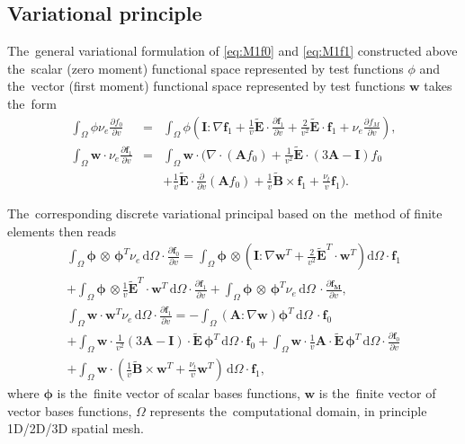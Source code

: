 \documentclass[preprint,12pt]{elsarticle}
\newcommand{\pdv}[2]{\frac{\partial{#1}}{\partial{#2}}}
\newcommand{\vect}[1]{\boldsymbol{#1}}
\newcommand{\matr}[1]{\mathbf{#1}}
\newcommand{\dI}{\text{d}}
\newcommand{\nue}{\nu_{e}}
\newcommand{\nutot}{\nu_{t}}
\newcommand{\vmag}{v}
\newcommand{\B}{\vect{B}}
\newcommand{\tE}{\vect{\tilde{E}}}
\newcommand{\tB}{\vect{\tilde{B}}}
\newcommand{\fM}{f_M}
\newcommand{\fzero}{f_0}
\newcommand{\vfzero}{\vect{f}_0}
\newcommand{\fone}{\vect{f}_1}
\newcommand{\MI}{\matr{I}}
\newcommand{\MA}{\matr{A}}
\newcommand{\intO}{\int_{\Omega}}
\newcounter{bla}
\begin{document}
\subsection{Variational principle}
The~general variational formulation of \eqref{eq:M1f0} and \eqref{eq:M1f1} 
constructed above the~scalar (zero moment) functional space
represented by test functions $\phi$ and the~vector
(first moment) functional space represented by test functions $\vect{w}$ 
takes the~form
\begin{eqnarray}
  \intO\phi\nue\pdv{\fzero}{\vmag} &=& 
  \intO\phi
  \left(\MI:\nabla\fone + 
  \frac{1}{\vmag}\tE\cdot\pdv{\fone}{\vmag}
  + \frac{2}{\vmag^2}\tE\cdot\fone + \nue \pdv{\fM}{\vmag}\right) , 
  \label{eq:M1hosf0_variational}\\
  \intO\vect{w}\cdot\nue\pdv{\fone}{\vmag} &=&
  \intO\vect{w}\cdot\Bigg(\nabla\cdot\left(\MA\fzero\right)  
  + \frac{1}{\vmag^2}\tE\cdot\left( 3\MA - \MI \right)\fzero
  \nonumber\\
  && 
  + \frac{1}{\vmag}\tE\cdot\pdv{}{\vmag}
  \left( \MA\fzero\right) + \frac{1}{\vmag}\tB\times\fone + 
  \frac{\nutot}{\vmag}\fone\Bigg) .
  \label{eq:M1hosf1_variational}
\end{eqnarray}

The~corresponding discrete variational principal based on the~method of 
finite elements then reads
\begin{multline}
  \intO\vect{\phi}\, \otimes\, \vect{\phi}^T 
  \nue\, \dI \Omega \cdot \pdv{\vfzero}{\vmag} = 
  \intO\vect{\phi}\, \otimes \left(\MI:\nabla\matr{w}^T + 
  \frac{2}{\vmag^2}\tE^T \cdot\matr{w}^T \right)\dI \Omega
  \cdot \fone \\
  + \intO\vect{\phi}\, \otimes
  \frac{1}{\vmag}\tE^T \cdot \matr{w}^T\, \dI \Omega 
  \cdot \pdv{\fone}{\vmag} + 
  \intO\vect{\phi}\, \otimes\, \vect{\phi}^T \nue\, \dI\Omega\,
  \cdot \pdv{\vect{\fM}}{\vmag} , 
  \label{eq:FEM1hosf0}
\end{multline}
\begin{multline}
  \intO\matr{w} \cdot \matr{w}^T \nue\, \dI\Omega \cdot 
  \pdv{\fone}{\vmag} =
  - \intO
  \left(\MA : \nabla\matr{w}\right)
  \vect{\phi}^T\, \dI \Omega\, 
  \cdot \vfzero \\
  + \intO\matr{w} \cdot 
  \frac{1}{\vmag^2} \left( 3\MA - \MI \right) \cdot \tE\,  
  \vect{\phi}^T\, \dI\Omega \cdot \vfzero 
  + \intO\matr{w} \cdot
  \frac{1}{\vmag} \MA \cdot \tE\, \vect{\phi}^T\, \dI \Omega 
  \cdot \pdv{\vfzero}{\vmag}\\
  + \intO\matr{w} \cdot
  \left(\frac{1}{\vmag}\tilde{\B}\times\matr{w}^T + 
  \frac{\nutot}{\vmag} \matr{w}^T\right)\, \dI\Omega 
  \cdot \fone ,
  \label{eq:FEM1hosf1}
\end{multline}
where $\vect{\phi}$ is the~finite vector of scalar bases functions, 
$\matr{w}$ is the~finite vector of vector bases functions,
$\Omega$ represents the~computational domain, in principle 1D/2D/3D 
spatial mesh. 
\end{document}
